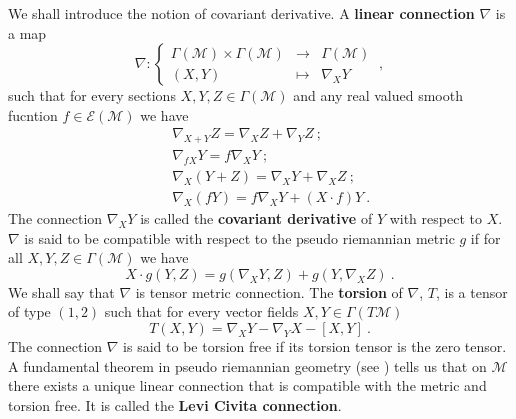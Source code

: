 \documentclass[11pt]{book}
\newcommand{\Ecal}{\mathcal{E}}
\newcommand{\Mcal}{\mathcal{M}}
\theoremstyle{break}
\begin{document}
We shall introduce the notion of covariant derivative. A \textbf{linear connection} $\nabla$ is a map 
%
\begin{equation*}
\nabla : \left\{
\begin{array}{ccl}
\Gamma(\Mcal) \times \Gamma(\Mcal) & \to & \Gamma(\Mcal) \\
(X,Y) & \mapsto & \nabla_X Y 
\end{array}
\right. \ ,
\end{equation*}
%
such that for every sections $X, Y, Z \in \Gamma(\Mcal)$ and any real valued smooth fucntion $f \in \Ecal(\Mcal)$ we have
%
\begin{eqnarray*}
&& \nabla_{X + Y} Z = \nabla_X Z + \nabla_Y Z \ ; \\ 
&& \nabla_{f X} Y = f \nabla_X Y \ ;\\
&& \nabla_X(Y+Z) = \nabla_X Y + \nabla_X Z \ ;\\
&& \nabla_X(fY) = f \nabla_X Y + (X \cdot f) Y \ .
\end{eqnarray*}
%
The connection $\nabla_X Y$ is called the \textbf{covariant derivative} of $Y$ with respect to $X$. $\nabla$ is said to be compatible with respect to the pseudo riemannian metric $g$ if for all $X, Y, Z \in \Gamma(\Mcal)$ we have
%
\begin{equation*}
X \cdot g(Y,Z) = g(\nabla_X Y, Z) + g(Y,\nabla_X Z) \ .
\end{equation*}
%
We shall say that $\nabla$ is tensor metric connection. The \textbf{torsion} of $\nabla$, $T$, is a tensor of type $(1,2)$ such that for every vector fields $X, Y \in \Gamma(T\Mcal)$ 
%
\begin{equation*}
T(X,Y) = \nabla_X Y - \nabla_Y X - \left[ X,Y\right] \ .
\end{equation*}
%
The connection $\nabla$ is said to be torsion free if its torsion tensor is the zero tensor. A fundamental theorem in pseudo riemannian geometry (see \cite{oneill_semi-riemannian_1983}) tells us that on $\Mcal$ there exists a unique linear connection that is compatible with the metric and torsion free. It is called the \textbf{Levi Civita connection}.
\end{document}
